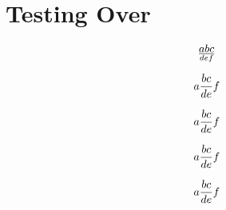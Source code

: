\documentclass{article}
\def\beginfoo{\bgroup}
\def\endfoo{\egroup}
\begin{document}
\section{Testing Over}
\[ a b c \over d e f \]

\[ a {b c \over d e} f \]

\[ a {b c \over d e\egroup f \]

\[ a \bgroup b c \over d e\egroup f \]

\[ a \beginfoo b c \over d e\endfoo f \]

\end{document}
